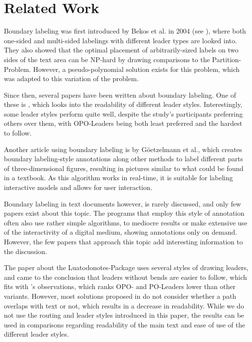 \documentclass[11pt,a4paper]{vutinfth}
\begin{document}

\section{Related Work}

Boundary labeling was first introduced by Bekos et al. in 2004 (see \cite{Bekos2005}), where both one-sided and multi-sided labelings with different leader types are looked into. They also showed that the optimal placement of arbitrarily-sized labels on two sides of the text area can be NP-hard by drawing comparisons to the Partition-Problem. However, a pseudo-polynomial solution exists for this problem, which was adapted to this variation of the problem.

Since then, several papers have been written about boundary labeling. One of these is \cite{Barth2015}, which looks into the readability of different leader styles. Interestingly, some leader styles perform quite well, despite the study's participants preferring others over them, with OPO-Leaders being both least preferred and the hardest to follow.

Another article using boundary labeling is \cite{Goetzelmann2006} by G{\"o}etzelmann et al., which creates boundary labeling-style annotations along other methods to label different parts of three-dimensional figures, resulting in pictures similar to what could be found in a textbook. As this algorithm works in real-time, it is suitable for labeling interactive models and allows for user interaction.


Boundary labeling in text documents however, is rarely discussed, and only few papers exist about this topic. The programs that employ this style of annotation often also use rather simple algorithms, to mediocre results or make extensive use of the interactivity of a digital medium, showing annotations only on demand. However, the few papers that approach this topic add interesting information to the discussion.

The paper about the Luatodonotes-Package\cite{Kindermann2014} uses several styles of drawing leaders, and came to the conclusion that leaders without bends are easier to follow, which fits with \cite{Barth2015}'s observations, which ranks OPO- and PO-Leaders lower than other variants.
However, most solutions proposed in \cite{Kindermann2014} do not consider whether a path overlaps with text or not, which results in a decrease in readability. While we do not use the routing and leader styles introduced in this paper, the results can be used in comparisons regarding readability of the main text and ease of use of the different leader styles.%
\end{document}
